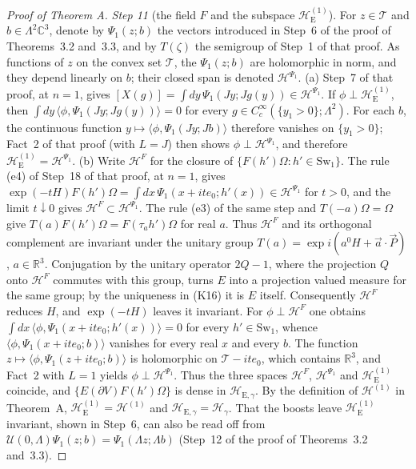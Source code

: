 \documentclass[11pt]{amsart}
\theoremstyle{definition}
\begin{document}
\begin{proof}[Proof of Theorem A]
\emph{Step 11} (the field $F$ and the subspace $\mathcal H_{\mathrm E}^{(1)}$).
For $z\in\mathcal T$ and $b\in\Lambda^2\mathbb C^3$, denote by $\Psi_1(z;b)$ the vectors introduced in Step~6 of the proof of Theorems~3.2 and~3.3, and by $T(\zeta)$ the semigroup of Step~1 of that proof.
As functions of $z$ on the convex set $\mathcal T$, the $\Psi_1(z;b)$ are holomorphic in norm, and they depend linearly on $b$;
their closed span is denoted $\mathcal H^{\Psi_1}$.
(a) Step~7 of that proof, at $n=1$, gives $[X(g)]=\int dy\,\Psi_1(Jy;Jg(y))\in\mathcal H^{\Psi_1}$.
If $\phi\perp\mathcal H_{\mathrm E}^{(1)}$, then $\int dy\,\langle\phi,\Psi_1(Jy;Jg(y))\rangle=0$ for every $g\in C_c^\infty(\{y_1>0\};\Lambda^2)$.
For each $b$, the continuous function $y\mapsto\langle\phi,\Psi_1(Jy;Jb)\rangle$ therefore vanishes on $\{y_1>0\}$;
Fact~2 of that proof (with $L=J$) then shows $\phi\perp\mathcal H^{\Psi_1}$, and therefore $\mathcal H_{\mathrm E}^{(1)}=\mathcal H^{\Psi_1}$.
(b) Write $\mathcal H^F$ for the closure of $\{F(h')\Omega:h'\in\mathrm{Sw}_1\}$.
The rule (e4) of Step~18 of that proof, at $n=1$, gives $\exp(-tH)F(h')\Omega=\allowbreak \int dx\,\allowbreak \Psi_1(x+ite_0;h'(x))\in\mathcal H^{\Psi_1}$ for $t>0$, and the limit $t\downarrow0$ gives $\mathcal H^F\subset\mathcal H^{\Psi_1}$.
The rule (e3) of the same step and $T(-a)\Omega=\Omega$ give $T(a)F(h')\Omega=F(\tau_ah')\Omega$ for real $a$.
Thus $\mathcal H^F$ and its orthogonal complement are invariant under the unitary group $T(a)=\exp i(a^0H+\vec a\cdot\vec P)$, $a\in\mathbb R^3$.
Conjugation by the unitary operator $2Q-1$, where the projection $Q$ onto $\mathcal H^F$ commutes with this group, turns $E$ into a projection valued measure for the same group;
by the uniqueness in (K16) it is $E$ itself.
Consequently $\mathcal H^F$ reduces $H$, and $\exp(-tH)$ leaves it invariant.
For $\phi\perp\mathcal H^F$ one obtains $\int dx\,\langle\phi,\Psi_1(x+ite_0;h'(x))\rangle=0$ for every $h'\in\mathrm{Sw}_1$, whence $\langle\phi,\Psi_1(x+ite_0;b)\rangle$ vanishes for every real $x$ and every $b$.
The function $z\mapsto\langle\phi,\Psi_1(z+ite_0;b)\rangle$ is holomorphic on $\mathcal T-ite_0$, which contains $\mathbb R^3$, and Fact~2 with $L=1$ yields $\phi\perp\mathcal H^{\Psi_1}$.
Thus the three spaces $\mathcal H^F$, $\mathcal H^{\Psi_1}$ and $\mathcal H_{\mathrm E}^{(1)}$ coincide, and $\{E(\partial V)F(h')\Omega\}$ is dense in $\mathcal H_{\mathrm E,\gamma}$.
By the definition of $\mathcal H^{(1)}$ in Theorem~A,
$\mathcal H_{\mathrm E}^{(1)}=\mathcal H^{(1)}$ and
$\mathcal H_{\mathrm E,\gamma}=\mathcal H_\gamma$.
That the boosts leave $\mathcal H_{\mathrm E}^{(1)}$ invariant, shown in Step~6, can also be read off from $\mathcal U(0,\Lambda)\Psi_1(z;b)=\Psi_1(\Lambda z;\Lambda b)$ (Step~12 of the proof of Theorems~3.2 and~3.3).


\end{proof}
\end{document}
